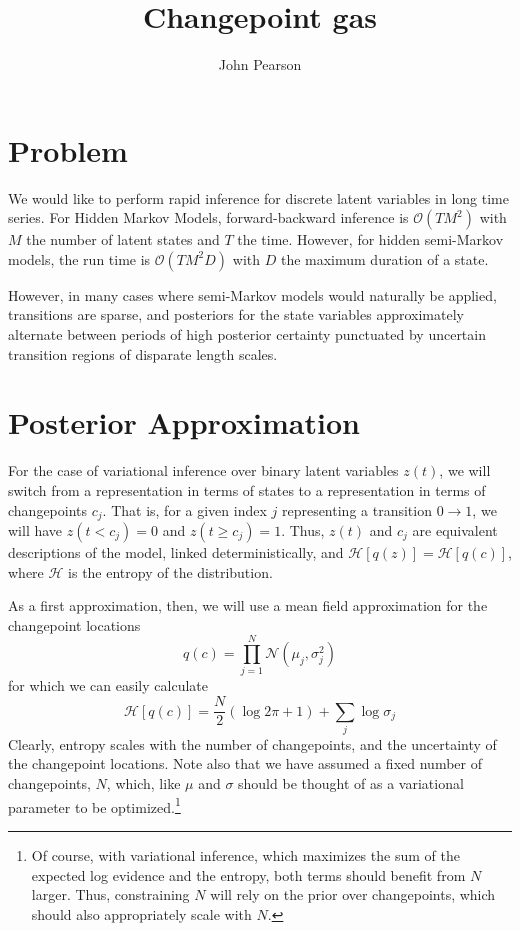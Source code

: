 \documentclass[11pt]{article}
\begin{document}
\title{Changepoint gas}
\author{John Pearson}
\maketitle

\section{Problem}
We would like to perform rapid inference for discrete latent variables in long time series. For Hidden Markov Models, forward-backward inference is $\mathcal{O}(TM^2)$ with $M$ the number of latent states and $T$ the time. However, for hidden semi-Markov models, the run time is $\mathcal{O}(TM^2 D)$ with $D$ the maximum duration of a state.

However, in many cases where semi-Markov models would naturally be applied, transitions are sparse, and posteriors for the state variables approximately alternate between periods of high posterior certainty punctuated by uncertain transition regions of disparate length scales.

\section{Posterior Approximation}
For the case of variational inference over binary latent variables $z(t)$, we will switch from a representation in terms of states to a representation in terms of changepoints $c_j$. That is, for a given index $j$ representing a transition $0 \rightarrow 1$, we will have $z(t < c_j) = 0$ and $z(t \ge c_j) = 1$. Thus, $z(t)$ and $c_j$ are equivalent descriptions of the model, linked deterministically, and $\mathcal{H}[q(z)] = \mathcal{H}[q(c)]$, where $\mathcal{H}$ is the entropy of the distribution.

As a first approximation, then, we will use a mean field approximation for the changepoint locations
\begin{equation}
    q(c) = \prod_{j = 1}^N \mathcal{N}(\mu_j, \sigma^2_j)
\end{equation}
for which we can easily calculate
\begin{equation}
    \mathcal{H}[q(c)] = \frac{N}{2}(\log 2\pi + 1) + \sum_j \log \sigma_j
\end{equation}
Clearly, entropy scales with the number of changepoints, and the uncertainty of the changepoint locations. Note also that we have assumed a fixed number of changepoints, $N$, which, like $\mu$ and $\sigma$ should be thought of as a variational parameter to be optimized.\footnote{Of course, with variational inference, which maximizes the sum of the expected log evidence and the entropy, both terms should benefit from $N$ larger. Thus, constraining $N$ will rely on the prior over changepoints, which should also appropriately scale with $N$.}
\end{document}
